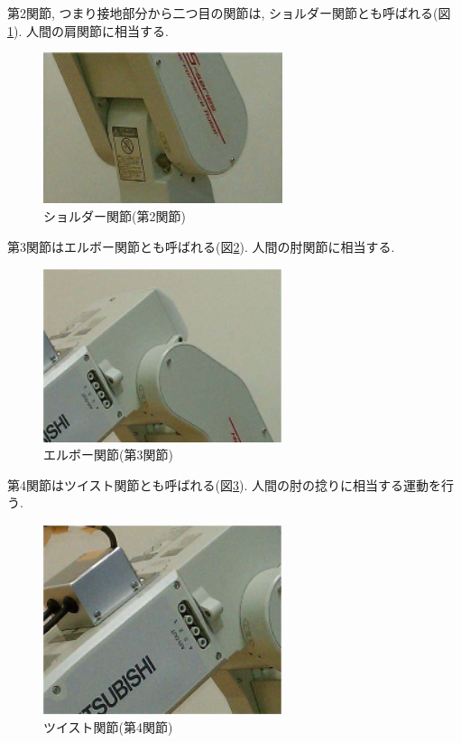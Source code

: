 \documentclass[a4paper,11pt]{jsarticle}
\begin{document}
\newpage
第2関節, つまり接地部分から二つ目の関節は, ショルダー関節とも呼ばれる(図\ref{ショルダー関節}). 人間の肩関節に相当する.
\begin{figure}[H]
  \begin{center}
    \includegraphics[width = 7cm]{画像/ショルダー関節.png}
    \caption{ショルダー関節(第2関節)}
    \label{ショルダー関節}
  \end{center}
\end{figure}

第3関節はエルボー関節とも呼ばれる(図\ref{エルボー関節}). 人間の肘関節に相当する.
\begin{figure}[H]
  \begin{center}
    \includegraphics[width = 7cm]{画像/エルボー関節.png}
    \caption{エルボー関節(第3関節)}
    \label{エルボー関節}
  \end{center}
\end{figure}

第4関節はツイスト関節とも呼ばれる(図\ref{ツイスト関節}). 人間の肘の捻りに相当する運動を行う.
\begin{figure}[H]
  \begin{center}
    \includegraphics[width = 7cm]{画像/ツイスト関節.png}
    \caption{ツイスト関節(第4関節)}
    \label{ツイスト関節}
  \end{center}
\end{figure}
\end{document}
